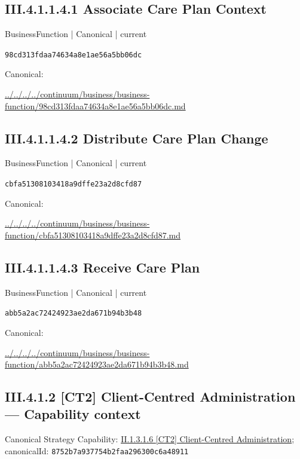 \documentclass[10pt,a4paper]{article}
\begin{document}
\subsection*{III.4.1.1.4.1 Associate Care Plan Context}
\label{element-98cd313fdaa74634a8e1ae56a5bb06dc}
{\small BusinessFunction | Canonical | current}\par
\texttt{98cd313fdaa74634a8e1ae56a5bb06dc}\par
Canonical: \par
{\footnotesize\url{../../../../continuum/business/business-function/98cd313fdaa74634a8e1ae56a5bb06dc.md}}\par
\subsection*{III.4.1.1.4.2 Distribute Care Plan Change}
\label{element-cbfa51308103418a9dffe23a2d8cfd87}
{\small BusinessFunction | Canonical | current}\par
\texttt{cbfa51308103418a9dffe23a2d8cfd87}\par
Canonical: \par
{\footnotesize\url{../../../../continuum/business/business-function/cbfa51308103418a9dffe23a2d8cfd87.md}}\par
\subsection*{III.4.1.1.4.3 Receive Care Plan}
\label{element-abb5a2ac72424923ae2da671b94b3b48}
{\small BusinessFunction | Canonical | current}\par
\texttt{abb5a2ac72424923ae2da671b94b3b48}\par
Canonical: \par
{\footnotesize\url{../../../../continuum/business/business-function/abb5a2ac72424923ae2da671b94b3b48.md}}\par
\subsection*{III.4.1.2 [CT2] Client-Centred Administration — Capability context}
Canonical Strategy Capability: \hyperref[element-8752b7a937754b2faa296300c6a48911]{II.1.3.1.6 [CT2] Client-Centred Administration}; canonicalId: \texttt{8752b7a937754b2faa296300c6a48911}\par
\end{document}
